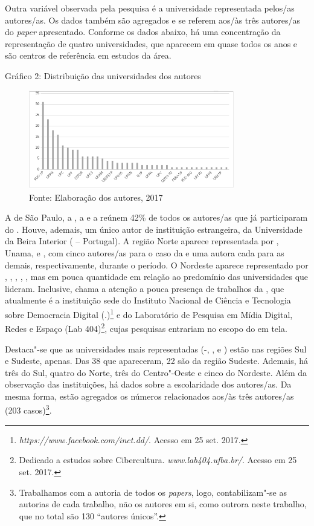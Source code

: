 Outra variável observada pela pesquisa é a universidade representada
pelos/as autores/as. Os dados também são agregados e se referem aos/às
três autores/as do \emph{paper} apresentado. Conforme os dados abaixo,
há uma concentração da representação de quatro universidades, que
aparecem em quase todos os anos e são centros de referência em estudos
da área.

Gráfico 2: Distribuição das universidades dos autores

\begin{figure}[!ht]
\centering
 \includegraphics[width=90mm]{./imgs/graf3_2.png}
\caption{Fonte: Elaboração dos autores, 2017}
\end{figure}

A  de São Paulo, a , a  e a  reúnem 42\% de todos os
autores/as que já participaram do . Houve, ademais, um único autor de
instituição estrangeira, da Universidade da Beira Interior ( --
Portugal). A região Norte aparece representada por , Unama,  e
, com cinco autores/as para o caso da  e uma autora cada para as
demais, respectivamente, durante o período. O Nordeste aparece
representado por , , , , , mas em pouca quantidade em
relação ao predomínio das universidades que lideram. Inclusive, chama a
atenção a pouca presença de trabalhos da , que atualmente é a
instituição sede do Instituto Nacional de Ciência e Tecnologia sobre
Democracia Digital (.)\footnote{\emph{https://www.facebook.com/inct.dd/}.
  Acesso em 25 set. 2017.} e do Laboratório de Pesquisa em Mídia
Digital, Redes e Espaço (Lab 404)\footnote{Dedicado a estudos sobre
  Cibercultura. \emph{www.lab404.ufba.br/}.
  Acesso em 25 set. 2017.}, cujas pesquisas entrariam no escopo do  em
tela.

Destaca"-se que as universidades mais representadas (-, , 
e ) estão nas regiões Sul e Sudeste, apenas. Das 38 que apareceram,
22 são da região Sudeste. Ademais, há três do Sul, quatro do Norte, três
do Centro"-Oeste e cinco do Nordeste. Além da observação das
instituições, há dados sobre a escolaridade dos autores/as. Da mesma
forma, estão agregados os números relacionados aos/às três autores/as
(203 casos)\footnote{Trabalhamos com a autoria de todos os
  \emph{papers}, logo, contabilizam"-se as autorias de cada trabalho, não
  os autores em si, como outrora neste trabalho, que no total são 130
  ``autores únicos''.}.

